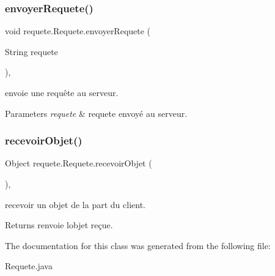 \subsubsection{\texorpdfstring{envoyer\+Requete()}{envoyerRequete()}}
{\footnotesize\ttfamily void requete.\+Requete.\+envoyer\+Requete (\begin{DoxyParamCaption}\item[{String}]{requete }\end{DoxyParamCaption})\hspace{0.3cm}{\ttfamily [inline]}, {\ttfamily [protected]}}



envoie une requête au serveur. 


\begin{DoxyParams}{Parameters}
{\em requete} & requete envoyé au serveur. \\
\hline
\end{DoxyParams}
\mbox{\label{classrequete_1_1Requete_a8aeabe00174a3542c9d6bbc940495e04}} 
\subsubsection{\texorpdfstring{recevoir\+Objet()}{recevoirObjet()}}
{\footnotesize\ttfamily Object requete.\+Requete.\+recevoir\+Objet (\begin{DoxyParamCaption}{ }\end{DoxyParamCaption})\hspace{0.3cm}{\ttfamily [inline]}, {\ttfamily [protected]}}



recevoir un objet de la part du client. 

\begin{DoxyReturn}{Returns}
renvoie l\textquotesingle{}objet reçue. 
\end{DoxyReturn}


The documentation for this class was generated from the following file\+:\begin{DoxyCompactItemize}
\item 
Requete.\+java\end{DoxyCompactItemize}
